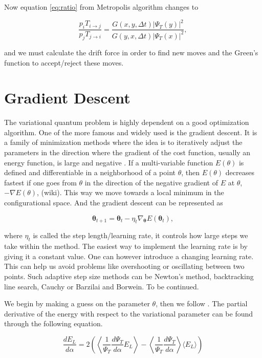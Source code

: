 Now equation \ref{eq:ratio} from Metropolis algorithm changes to 

$$\frac{p_i T_{i \rightarrow j}}{p_j T_{j \rightarrow i}} = \frac{G(x, y, \Delta t)|\Psi_T(y)|^2}{G(y, x, \Delta t)|\Psi_T(x)|^2},$$

and we must calculate the drift force in order to find new moves and the Green's function to accept/reject these moves.

\section{Gradient Descent}

The variational quantum problem is highly dependent on a good optimization algorithm. One of the more famous and widely used is the gradient descent. It is a family of minimization methods where the idea is to iteratively adjust the parameters in the direction where the gradient of the cost function, usually an energy function, is large and negative \cite{mehta2019high}. 
If a multi-variable function $E(\theta)$ is defined and differentiable in a neighborhood of a point $\theta$, then $E(\theta)$ decreases fastest if one goes from $\theta$ in the direction of the negative gradient of $E$ at $\theta$, $-\nabla E(\theta)$, (wiki). This way we move towards a local minimum in the configurational space. And the gradient descent can be represented as

\begin{equation} \label{eq:theta}
\mathbf{\theta}_{t+1} = \mathbf{\theta}_t - \eta_t \nabla_{\mathbf{\theta}} E(\mathbf{\theta}_t),
\end{equation}

where $\eta_t$ is called the step length/learning rate, it controls how large steps we take within the method.
The easiest way to implement the learning rate is by giving it a constant value. One can however introduce a changing learning rate. This can help us avoid problems like overshooting or oscillating between two points. Such adaptive step size methods can be Newton's method, backtracking line search, Cauchy or Barzilai and Borwein. To be continued. 

We begin by making a guess on the parameter $\theta$, then we follow . The partial derivative of the energy with respect to the variational parameter can be found through the following equation.

\begin{equation}
\frac{dE_L}{d\alpha} = 2 \left( \left\langle \frac{1}{\Psi_T}\frac{d \Psi_T}{d \alpha} E_L \right\rangle  - \left\langle  \frac{1}{\Psi_T}\frac{d \Psi_T}{d \alpha} \right\rangle \langle E_L \rangle \right)
\end{equation}

